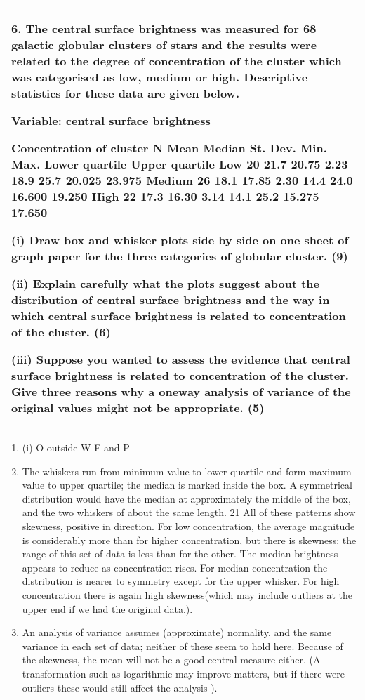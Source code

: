 \documentclass[a4paper,12pt]{article}
\begin{document}
\begin{table}[ht!]
 \centering
 \begin{tabular}{|p{15cm}|}
 \hline  
6. The central surface brightness was measured for 68 galactic globular clusters of stars and the results were related to the degree of concentration of the cluster which was categorised as low, medium or high.  Descriptive statistics for these data are given below. 
 
 
Variable: central surface brightness 
 
Concentration of cluster 
N Mean Median St. Dev. Min. Max. Lower quartile 
Upper quartile Low 20 21.7 20.75 2.23 18.9 25.7 20.025 23.975 Medium 26 18.1 17.85 2.30 14.4 24.0 16.600 19.250 High 22 17.3 16.30 3.14 14.1 25.2 15.275 17.650 
 
 
(i) Draw box and whisker plots side by side on one sheet of graph paper for the three categories of globular cluster. (9) 
 
(ii) Explain carefully what the plots suggest about the distribution of central surface brightness and the way in which central surface brightness is related to concentration of the cluster. (6) 
 
(iii) Suppose you wanted to assess the evidence that central surface brightness is related to concentration of the cluster.  Give three reasons why a oneway analysis of variance of the original values might not be appropriate. (5) \\ \hline
  \end{tabular}
\end{table}
\begin{enumerate}\item  (i)
O outside W F and P
\item The whiskers run from minimum value to lower quartile and form maximum value to
upper quartile; the median is marked inside the box. A symmetrical distribution would
have the median at approximately the middle of the box, and the two whiskers of about
the same length.
21
All of these patterns show skewness, positive in direction. For low concentration, the
average magnitude is considerably more than for higher concentration, but there is
skewness; the range of this set of data is less than for the other. The median brightness
appears to reduce as concentration rises. For median concentration the distribution is
nearer to symmetry except for the upper whisker.
For high concentration there is again high skewness(which may include outliers at the
upper end if we had the original data.).
\item An analysis of variance assumes (approximate) normality, and the same variance
in each set of data; neither of these seem to hold here. Because of the skewness, the
mean will not be a good central measure either.
(A transformation such as logarithmic may improve matters, but if there were outliers
these would still affect the analysis ).\end{enumerate}
\end{document}
